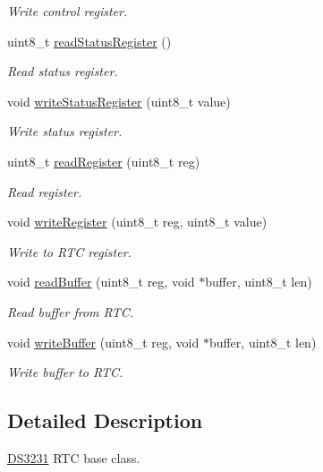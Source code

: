 \begin{DoxyCompactItemize}
\begin{DoxyCompactList}\small\item\em Write control register. \end{DoxyCompactList}\item 
uint8\+\_\+t \hyperlink{class_d_s3231_a29fb8f2fe94a93b80336b183d5e9fc0c}{read\+Status\+Register} ()
\begin{DoxyCompactList}\small\item\em Read status register. \end{DoxyCompactList}\item 
void \hyperlink{class_d_s3231_a5a937c59828e7aef61af8ae8f02bb0f8}{write\+Status\+Register} (uint8\+\_\+t value)
\begin{DoxyCompactList}\small\item\em Write status register. \end{DoxyCompactList}\item 
uint8\+\_\+t \hyperlink{class_d_s3231_a37cac2a6bbf52b801dcaf6471d4418ac}{read\+Register} (uint8\+\_\+t reg)
\begin{DoxyCompactList}\small\item\em Read register. \end{DoxyCompactList}\item 
void \hyperlink{class_d_s3231_a292109841c55ecebb7a920c6f87f5ac5}{write\+Register} (uint8\+\_\+t reg, uint8\+\_\+t value)
\begin{DoxyCompactList}\small\item\em Write to R\+TC register. \end{DoxyCompactList}\item 
void \hyperlink{class_d_s3231_ae72bc3b3e8164477762d14e7961daff0}{read\+Buffer} (uint8\+\_\+t reg, void $\ast$buffer, uint8\+\_\+t len)
\begin{DoxyCompactList}\small\item\em Read buffer from R\+TC. \end{DoxyCompactList}\item 
void \hyperlink{class_d_s3231_a6ba3dae2a1de95f8aaaed331ca47b239}{write\+Buffer} (uint8\+\_\+t reg, void $\ast$buffer, uint8\+\_\+t len)
\begin{DoxyCompactList}\small\item\em Write buffer to R\+TC. \end{DoxyCompactList}\end{DoxyCompactItemize}


\subsection{Detailed Description}
\hyperlink{class_d_s3231}{D\+S3231} R\+TC base class. 

